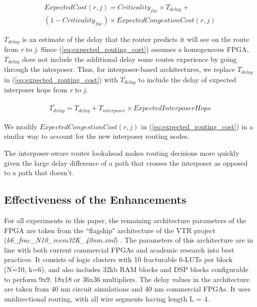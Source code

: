 \documentclass[journal]{IEEEtran}
\begin{document}
\setlength{\arraycolsep}{0.0em}
\begin{multline}
\label{eq:expected_routing_cost}
ExpectedCost(r,j) = Criticality_{fac} \times T_{delay} + \\(1 - Criticality_{fac}) \times ExpectedCongestionCost(r,j)
\end{multline}
\setlength{\arraycolsep}{5pt}

$T_{delay}$ is an estimate of the delay that the router predicts it will see on the route from \textit{r} to \textit{j}. Since (\ref{eq:expected_routing_cost}) assumes a homogeneous FPGA, $T_{delay}$ does not include the additional delay some routes experience by going through the interposer. Thus, for interposer-based architectures, we replace $T_{delay}$ in (\ref{eq:expected_routing_cost}) with $T^\prime_{delay}$ to include the delay of expected interposer hops from \textit{r} to \textit{j}.

\begin{multline}
\label{eq:tdelay}
T^\prime_{delay} = T_{delay} + T_{interposer} \times ExpectedInterposerHops
\end{multline}
\setlength{\arraycolsep}{5pt}

We modify $ExpectedCongestionCost(r,j)$ in (\ref{eq:expected_routing_cost}) in a similar way to account for the new interposer routing nodes. 

The interposer-aware router lookahead makes routing decisions more quickly given the large delay difference of a path that crosses the interposer as opposed to a path that doesn't.

\subsection{Effectiveness of the Enhancements}
\label{sec:CADeffect}
For all experiments in this paper, the remaining architecture parameters of the FPGA are taken from the ``flagship" architecture of the VTR project (\textit{k6\_frac\_N10\_mem32K\_40nm.xml}) \cite{luu2014vtr}. The parameters of this architecture are in line with both current commercial FPGAs and academic research into best practices. It consists of logic clusters with 10 fracturable 6-LUTs per block (N=10, k=6), and also includes 32kb RAM blocks and DSP blocks configurable to perform 9x9, 18x18 or 36x36 multipliers. The delay values in the architecture are taken from 40 nm circuit simulations and 40 nm commercial FPGAs. It uses unidirectional routing, with all wire segments having length L = 4.
\end{document}
